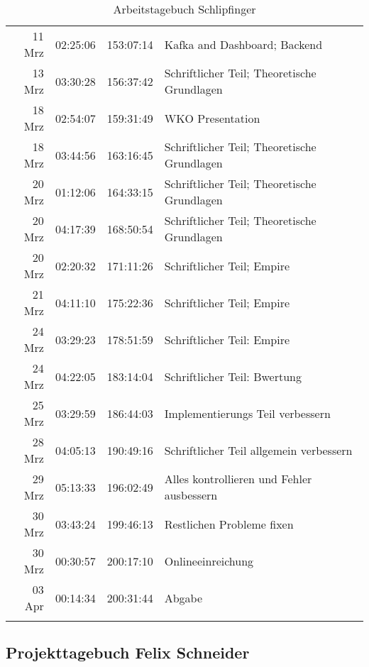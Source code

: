 \begin{longtable}{r | r | r | p{}}
	 11 Mrz & 02:25:06 & 153:07:14 & Kafka and Dashboard; Backend \\ 
	 13 Mrz & 03:30:28 & 156:37:42 & Schriftlicher Teil; Theoretische Grundlagen \\ 
	 18 Mrz & 02:54:07 & 159:31:49 & WKO Presentation \\ 
	 18 Mrz & 03:44:56 & 163:16:45 & Schriftlicher Teil; Theoretische Grundlagen \\ 
	 20 Mrz & 01:12:06 & 164:33:15 & Schriftlicher Teil; Theoretische Grundlagen \\ 
	 20 Mrz & 04:17:39 & 168:50:54 & Schriftlicher Teil; Theoretische Grundlagen \\ 
	 20 Mrz & 02:20:32 & 171:11:26 & Schriftlicher Teil; Empire \\ 
	 21 Mrz & 04:11:10 & 175:22:36 & Schriftlicher Teil; Empire \\ 
	 24 Mrz & 03:29:23 & 178:51:59 & Schriftlicher Teil: Empire \\ 
	 24 Mrz & 04:22:05 & 183:14:04 & Schriftlicher Teil: Bwertung \\ 
	 25 Mrz & 03:29:59 & 186:44:03 & Implementierungs Teil verbessern \\ 
	 28 Mrz & 04:05:13 & 190:49:16 & Schriftlicher Teil allgemein verbessern \\ 
	 29 Mrz & 05:13:33 & 196:02:49 & Alles kontrollieren und Fehler ausbessern \\ 
	 30 Mrz & 03:43:24 & 199:46:13 & Restlichen Probleme fixen \\ 
	 30 Mrz & 00:30:57 & 200:17:10 & Onlineeinreichung \\ 
	 03 Apr & 00:14:34 & 200:31:44 & Abgabe \\ 

    \caption{Arbeitstagebuch Schlipfinger}
    \label{tab:projectdiaryschlipfinger}
\end{longtable}

\subsection{Projekttagebuch Felix Schneider}

